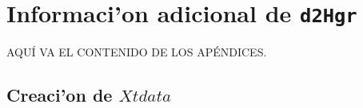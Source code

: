 \chapter{Informaci'on adicional de {\tt d2Hgr}}

AQU\'I VA EL CONTENIDO DE LOS AP\'ENDICES.
\vspace{5 mm}


\section{Creaci'on de $Xtdata$}




